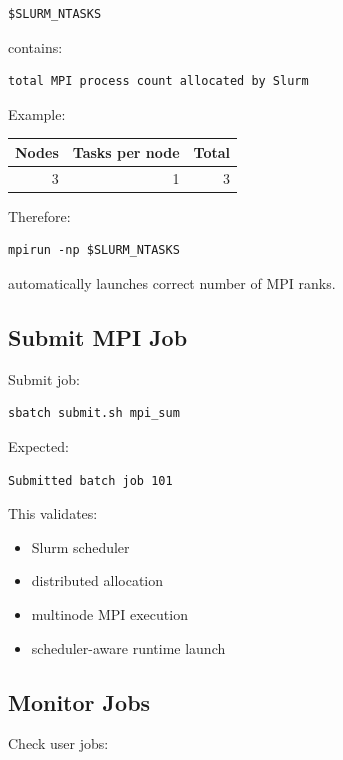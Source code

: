 \documentclass[11pt]{article}
\begin{document}
\begin{verbatim}
$SLURM_NTASKS
\end{verbatim}

contains:

\begin{verbatim}
total MPI process count allocated by Slurm
\end{verbatim}

Example:

\begin{center}
\begin{tabular}{rrr}
Nodes & Tasks per node & Total\\
\hline
3 & 1 & 3\\
\end{tabular}
\end{center}

Therefore:

\begin{verbatim}
mpirun -np $SLURM_NTASKS
\end{verbatim}

automatically launches correct number of MPI ranks.
\subsection{Submit MPI Job}
\label{sec:org2e7b708}

Submit job:

\begin{verbatim}
sbatch submit.sh mpi_sum
\end{verbatim}

Expected:

\begin{verbatim}
Submitted batch job 101
\end{verbatim}

This validates:

\begin{itemize}
\item Slurm scheduler
\item distributed allocation
\item multinode MPI execution
\item scheduler-aware runtime launch
\end{itemize}
\subsection{Monitor Jobs}
\label{sec:org16be97d}

Check user jobs:
\end{document}
